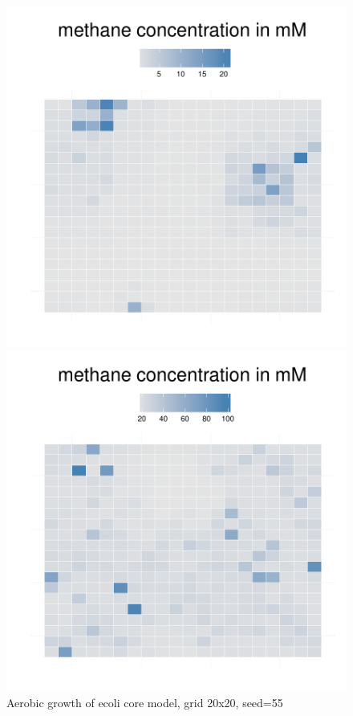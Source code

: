 \begin{figure}[h]
{\begin{minipage}[t]{0.3\textwidth}
  \end{minipage}
  \begin{minipage}[t]{0.3\textwidth}
    \includegraphics[width=\textwidth]{../results/barkeri_beijerinckii_20x20_seed6764_meth100.pdf}
  \end{minipage}
  \begin{minipage}[t]{0.3\textwidth}
    \includegraphics[width=\textwidth]{../results/barkeri_beijerinckii_20x20_seed6764_meth150.pdf}
  \end{minipage}
  }
  \caption{Aerobic growth of ecoli core model, grid 20x20, seed=55}
\end{figure}


